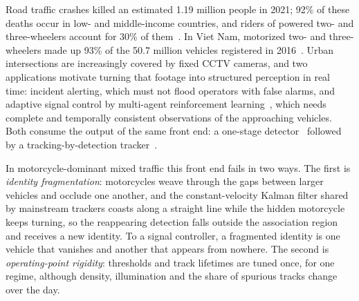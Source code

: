 \documentclass[twocolumn]{svjour3}
\begin{document}
Road traffic crashes killed an estimated 1.19 million people in 2021; 92\% of
these deaths occur in low- and middle-income countries, and riders of powered
two- and three-wheelers account for 30\% of them~\cite{WHO2023_roadsafety}. In
Viet Nam, motorized two- and three-wheelers made up 93\% of the 50.7 million
vehicles registered in 2016~\cite{WHO2018_roadsafety}. Urban intersections are
increasingly covered by fixed CCTV cameras, and two applications motivate
turning that footage into structured perception in real time: incident
alerting, which must not flood operators with false alarms, and adaptive signal
control by multi-agent reinforcement learning~\cite{Chu2020_marltsc,Yu2022_mappo},
which needs complete and temporally consistent observations of the approaching
vehicles. Both consume the output of the same front end: a one-stage
detector~\cite{Redmon2016_yolo,Jocher2024_yolo11} followed by a
tracking-by-detection tracker~\cite{Bewley2016_sort,Zhang2022_bytetrack}.

In motorcycle-dominant mixed traffic this front end fails in two ways. The
first is \emph{identity fragmentation}: motorcycles weave through the gaps
between larger vehicles and occlude one another, and the constant-velocity
Kalman filter shared by mainstream trackers coasts along a straight line while
the hidden motorcycle keeps turning, so the reappearing detection falls outside
the association region and receives a new identity. To a signal controller, a
fragmented identity is one vehicle that vanishes and another that appears from
nowhere. The second is \emph{operating-point rigidity}: thresholds and track
lifetimes are tuned once, for one regime, although density, illumination and the
share of spurious tracks change over the day.
\end{document}

